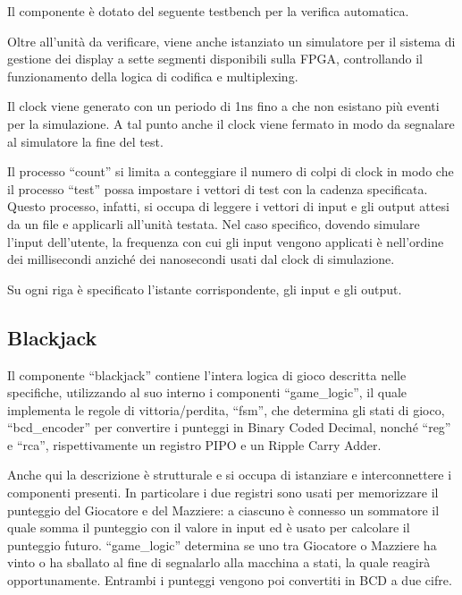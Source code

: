 \documentclass [11pt,a4paper,oneside,draft]{article}
\begin{document}
Il componente è dotato del seguente testbench per la verifica automatica.



Oltre all'unità da verificare, viene anche istanziato un simulatore per il
sistema di gestione dei display a sette segmenti disponibili sulla FPGA,
controllando il funzionamento della logica di codifica e multiplexing.

Il clock viene generato con un periodo di 1ns fino a che non esistano più
eventi per la simulazione. A tal punto anche il clock viene fermato in 
modo da segnalare al simulatore la fine del test.

Il processo ``count'' si limita a conteggiare il numero di colpi di clock
in modo che il processo ``test'' possa impostare i vettori di test con 
la cadenza specificata. Questo processo, infatti, si occupa di leggere
i vettori di input e gli output attesi da un file e applicarli all'unità
testata. Nel caso specifico, dovendo simulare l'input dell'utente, la
frequenza con cui gli input vengono applicati è nell'ordine dei 
millisecondi anziché dei nanosecondi usati dal clock di simulazione.



Su ogni riga è specificato l'istante corrispondente, gli input e gli
output.

\subsection{Blackjack}
Il componente ``blackjack'' contiene l'intera logica di gioco descritta
nelle specifiche, utilizzando al suo interno i componenti
``game\_logic'', il quale implementa le regole di vittoria/perdita,
``fsm'', che determina gli stati di gioco, ``bcd\_encoder'' per
convertire i punteggi in Binary Coded Decimal, nonché ``reg'' e ``rca'',
rispettivamente un registro PIPO e un Ripple Carry Adder.




Anche qui la descrizione è strutturale e si occupa di istanziare e 
interconnettere i componenti presenti. In particolare i due registri
sono usati per memorizzare il punteggio del Giocatore e del Mazziere:
a ciascuno è connesso un sommatore il quale somma il punteggio con il
valore in input ed è usato per calcolare il punteggio futuro.
``game\_logic'' determina se uno tra Giocatore o Mazziere ha vinto o
ha sballato al fine di segnalarlo alla macchina a stati, la quale
reagirà opportunamente. Entrambi i punteggi vengono poi convertiti in
BCD a due cifre.
\end{document}
